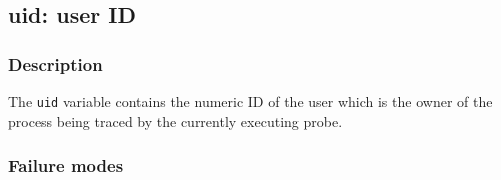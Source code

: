 \clearpage
{}
{}
\label{vars:uid}
\subsection*{uid: user ID}

\subsubsection*{Description}

The \verb|uid| variable contains the numeric ID of the user which is
the owner of the process being traced by the currently executing probe.

\subsubsection*{Failure modes}


